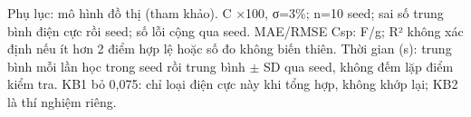 \par\smallskip\noindent Phụ lục: mô hình đồ thị (tham khảo). C ×100, σ=3\%; n=10 seed; sai số trung bình điện cực rồi seed; số lỗi cộng qua seed. MAE/RMSE Csp: F/g; R² không xác định nếu ít hơn 2 điểm hợp lệ hoặc số đo không biến thiên. Thời gian (s): trung bình mỗi lần học trong seed rồi trung bình $\pm$ SD qua seed, không đếm lặp điểm kiểm tra. KB1 bỏ 0,075: chỉ loại điện cực này khi tổng hợp, không khớp lại; KB2 là thí nghiệm riêng.\par
